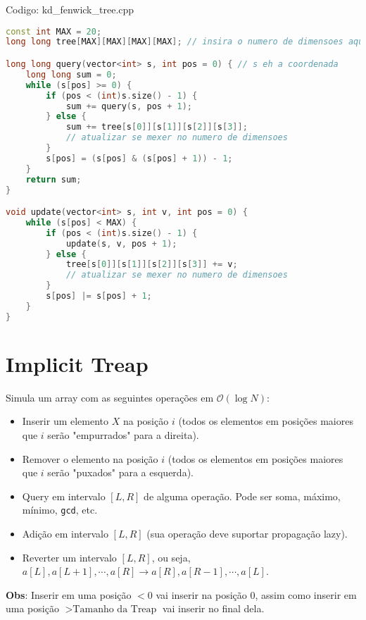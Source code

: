 \documentclass[10pt, a4paper, oneside]{book}
\begin{document}
\hfill

Codigo: kd\_fenwick\_tree.cpp

\begin{lstlisting}[language=C++]
const int MAX = 20;
long long tree[MAX][MAX][MAX][MAX]; // insira o numero de dimensoes aqui

long long query(vector<int> s, int pos = 0) { // s eh a coordenada
    long long sum = 0;
    while (s[pos] >= 0) {
        if (pos < (int)s.size() - 1) {
            sum += query(s, pos + 1);
        } else {
            sum += tree[s[0]][s[1]][s[2]][s[3]];
            // atualizar se mexer no numero de dimensoes
        }
        s[pos] = (s[pos] & (s[pos] + 1)) - 1;
    }
    return sum;
}

void update(vector<int> s, int v, int pos = 0) {
    while (s[pos] < MAX) {
        if (pos < (int)s.size() - 1) {
            update(s, v, pos + 1);
        } else {
            tree[s[0]][s[1]][s[2]][s[3]] += v;
            // atualizar se mexer no numero de dimensoes
        }
        s[pos] |= s[pos] + 1;
    }
}\end{lstlisting}
\hfill

\section{Implicit Treap}


Simula um array com as seguintes operações em $\mathcal{O}(\log N)$:



\begin{itemize}
\item Inserir um elemento $X$ na posição $i$ (todos os elementos em posições maiores que $i$ serão "empurrados" para a direita).
\item Remover o elemento na posição $i$ (todos os elementos em posições maiores que $i$ serão "puxados" para a esquerda).
\item Query em intervalo $[L, R]$ de alguma operação. Pode ser soma, máximo, mínimo, \texttt{gcd}, etc.
\item Adição em intervalo $[L, R]$ (sua operação deve suportar propagação lazy).
\item Reverter um intervalo $[L, R]$, ou seja, $a[L], a[L + 1], \cdots, a[R] \rightarrow a[R], a[R - 1], \cdots, a[L]$.
\end{itemize}



\textbf{Obs}: Inserir em uma posição $<0$ vai inserir na posição $0$, assim como inserir em uma posição $>\text{Tamanho da Treap}$ vai inserir no final dela.
\end{document}

